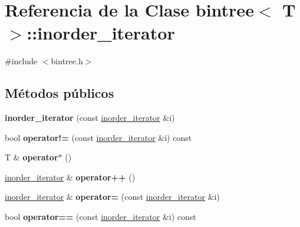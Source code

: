 \hypertarget{classbintree_1_1inorder__iterator}{}\section{Referencia de la Clase bintree$<$ T $>$\+:\+:inorder\+\_\+iterator}
\label{classbintree_1_1inorder__iterator}


{\ttfamily \#include $<$bintree.\+h$>$}

\subsection*{Métodos públicos}
\begin{DoxyCompactItemize}
\item 
\hypertarget{classbintree_1_1inorder__iterator_ae17ab42841cae123a3eff9a5ef076729}{}{\bfseries inorder\+\_\+iterator} (const \hyperlink{classbintree_1_1inorder__iterator}{inorder\+\_\+iterator} \&i)\label{classbintree_1_1inorder__iterator_ae17ab42841cae123a3eff9a5ef076729}

\item 
\hypertarget{classbintree_1_1inorder__iterator_a6f14a4225a48b4a6f25f5ca39807d0ae}{}bool {\bfseries operator!=} (const \hyperlink{classbintree_1_1inorder__iterator}{inorder\+\_\+iterator} \&i) const \label{classbintree_1_1inorder__iterator_a6f14a4225a48b4a6f25f5ca39807d0ae}

\item 
\hypertarget{classbintree_1_1inorder__iterator_a9fabb11c1557118623e645cde49122e3}{}T \& {\bfseries operator$\ast$} ()\label{classbintree_1_1inorder__iterator_a9fabb11c1557118623e645cde49122e3}

\item 
\hypertarget{classbintree_1_1inorder__iterator_a7363f5ccd154e848a0fb379a54df61a5}{}\hyperlink{classbintree_1_1inorder__iterator}{inorder\+\_\+iterator} \& {\bfseries operator++} ()\label{classbintree_1_1inorder__iterator_a7363f5ccd154e848a0fb379a54df61a5}

\item 
\hypertarget{classbintree_1_1inorder__iterator_ab2ccf194ba30696c8c0a39b856f0456b}{}\hyperlink{classbintree_1_1inorder__iterator}{inorder\+\_\+iterator} \& {\bfseries operator=} (const \hyperlink{classbintree_1_1inorder__iterator}{inorder\+\_\+iterator} \&i)\label{classbintree_1_1inorder__iterator_ab2ccf194ba30696c8c0a39b856f0456b}

\item 
\hypertarget{classbintree_1_1inorder__iterator_a10fb31268e741d7ac94da75d934d9683}{}bool {\bfseries operator==} (const \hyperlink{classbintree_1_1inorder__iterator}{inorder\+\_\+iterator} \&i) const \label{classbintree_1_1inorder__iterator_a10fb31268e741d7ac94da75d934d9683}

\end{DoxyCompactItemize}
